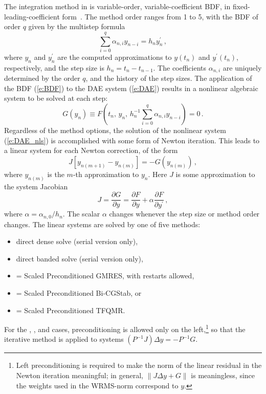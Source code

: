 The integration method in {\ida} is variable-order, variable-coefficient
BDF, in fixed-leading-coefficient form~\cite{BCP:96}.
The method order ranges from 1 to 5, with the BDF of order $q$
given by the multistep formula
\begin{equation}\label{e:BDF}
  \sum_{i=0}^q \alpha_{n,i}y_{n-i} = h_n y^\prime_n \, ,
\end{equation}
where $y_n$ and $y^\prime_n$ are the computed approximations to $y(t_n)$
and $y^\prime(t_n)$, respectively, and the step size is $h_n = t_n - t_{n-1}$.  
The coefficients $\alpha_{n,i}$ are uniquely determined by the order
$q$, and the history of the step sizes.  The application of the BDF
(\ref{e:BDF}) to the DAE system (\ref{e:DAE}) results in a nonlinear
algebraic system to be solved at each step:
\begin{equation}\label{e:DAE_nls}
  G(y_n) \equiv 
  F \left( t_n , \, y_n , \, 
    h_n^{-1} \sum_{i=0}^q \alpha_{n,i}y_{n-i} \right) = 0 \, .
\end{equation}
%
Regardless of the method options, the solution of the nonlinear system
(\ref{e:DAE_nls}) is accomplished with some form of Newton iteration.
This leads to a linear system for each Newton correction, of the form
\begin{equation}\label{e:DAE_Newtoncorr}
  J [y_{n(m+1)} - y_{n(m)}] = -G(y_{n(m)})  \, , 
\end{equation}
where $y_{n(m)}$ is the $m$-th approximation to $y_n$. 
%
Here $J$ is some approximation to the system Jacobian
\begin{equation}\label{e:DAE_Jacobian}
  J = \frac{\partial G}{\partial y}
  = \frac{\partial F}{\partial y} + 
  \alpha\frac{\partial F}{\partial y^\prime} \, ,
\end{equation}
where $\alpha = \alpha_{n,0}/h_n$.  The scalar $\alpha$ changes 
whenever the step size or method order changes.
%
The linear systems are solved by one of five methods:
\begin{itemize}
\item direct dense solve (serial version only),
\item direct banded solve (serial version only),
\item {\spgmr} = Scaled Preconditioned GMRES, with restarts allowed,
\item {\spbcg} = Scaled Preconditioned Bi-CGStab, or
\item {\sptfqmr} = Scaled Preconditioned TFQMR.
\end{itemize}
For the {\spgmr}, {\spbcg}, and {\sptfqmr} cases, preconditioning is allowed
only on the left,\footnote{Left preconditioning is required to make the norm of
the linear residual in the Newton iteration meaningful; in general,
$\| J \Delta y + G \|$ is meaningless, since the weights used in 
the WRMS-norm correspond to $y$.}
so that the iterative method is applied to systems $(P^{-1}J)\Delta y = -P^{-1}G$. 

